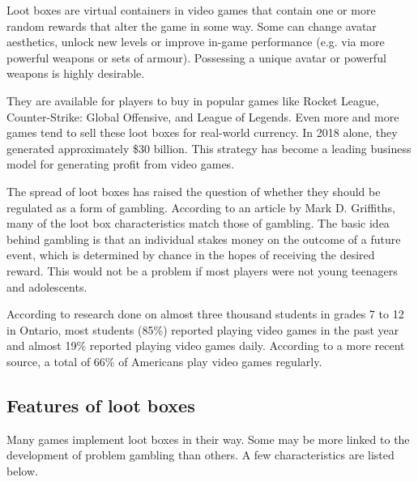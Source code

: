 \documentclass[10pt,oneside,english,a4paper]{article}
\begin{document}
	Loot boxes are virtual containers in video games that contain one or more random rewards that alter the game in some way. Some can change avatar aesthetics, unlock new levels or improve in-game performance (e.g. via more powerful weapons or sets of armour). Possessing a unique avatar or powerful weapons is highly desirable. \par
	They are available for players to buy in popular games like Rocket League, Counter-Strike: Global Offensive, and League of Legends. Even more and more games tend to sell these loot boxes for real-world currency. In 2018 alone, they generated approximately \$30 billion\cite{juniper:revenue}. This strategy has become a leading business model for generating profit from video games. \par
	The spread of loot boxes has raised the question of whether they should be regulated as a form of gambling. According to an article by Mark D. Griffiths, many of the loot box characteristics match those of gambling. The basic idea behind gambling is that an individual stakes money on the outcome of a future event, which is determined by chance in the hopes of receiving the desired reward. This would not be a problem if most players were not young teenagers and adolescents. \par
	According to research\cite{springer:research} done on almost three thousand students in grades 7 to 12 in Ontario, most students (85\%) reported playing video games in the past year and almost 19\% reported playing video games daily. According to a more recent source\cite{theesa:facts}, a total of 66\% of Americans play video games regularly. 

\pagebreak
\subsection{Features of loot boxes} \label{sec:features}

	Many games implement loot boxes in their way. Some may be more linked to the development of problem gambling than others. A few characteristics are listed below.
\end{document}
